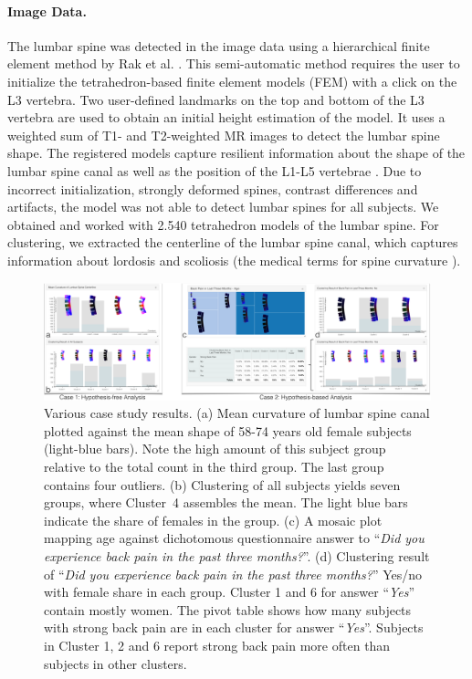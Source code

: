 \documentclass[journal]{style/vgtc} 			          %
\begin{document}
\paragraph{Image Data.} \label{Image-Data}
The lumbar spine was detected in the image data using a hierarchical finite element method by Rak et al. \cite{Rak2013}.
%
This semi-automatic method requires the user to initialize the tetrahedron-based finite element models (FEM) with a click on the L3 vertebra.
%
Two user-defined landmarks on the top and bottom of the L3 vertebra are used to obtain an initial height estimation of the model.
%
It uses a weighted sum of T1- and T2-weighted MR images to detect the lumbar spine shape.
%
The registered models capture resilient information about the shape of the lumbar spine canal as well as the position of the L1-L5 vertebrae \cite{Klemm2013VMV}.
%
Due to incorrect initialization, strongly deformed spines, contrast differences and artifacts, the model was not able to detect lumbar spines for all subjects.
%
We obtained and worked with 2.540 tetrahedron models of the lumbar spine.
%
For clustering, we extracted the centerline of the lumbar spine canal, which captures information about lordosis and scoliosis (the medical terms for spine curvature \cite{Klemm2013VMV}).

\begin{figure}[htb]
 \centering
 \includegraphics[width=1\textwidth, resolution=300]{figures/evaluation}
 \caption{Various case study results.
 (a) Mean curvature of lumbar spine canal plotted against the mean shape of 58-74 years old female subjects (light-blue bars).
 Note the high amount of this subject group relative to the total count in the third group. The last group contains four outliers.
 (b) Clustering of all subjects yields seven groups, where Cluster~4 assembles the mean. The light blue bars indicate the share of females in the group.
 (c) A mosaic plot mapping age against dichotomous questionnaire answer to ``\emph{Did you experience back pain in the past three months?}''.
 (d) Clustering result of ``\emph{Did you experience back pain in the past three months?}'' Yes/no with female share in each group. 
 Cluster 1 and 6 for answer ``\emph{Yes}'' contain mostly women.
 The pivot table shows how many subjects with strong back pain are in each cluster for answer ``\emph{Yes}''.
 Subjects in Cluster 1, 2 and 6 report strong back pain more often than subjects in other clusters.
 }
 \label{fig:application}
\end{figure}
\end{document}
